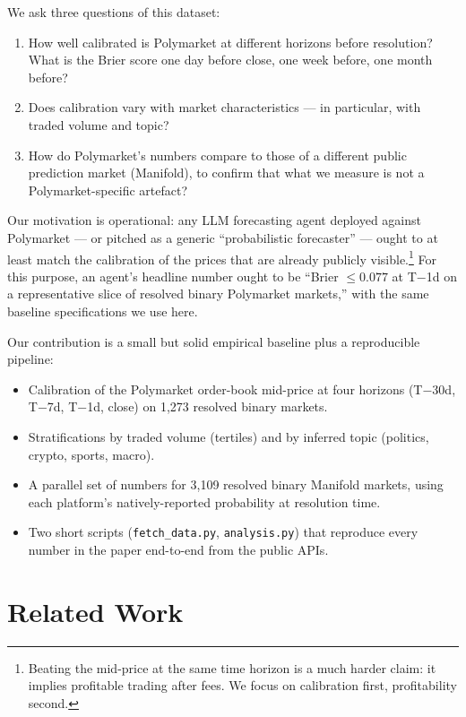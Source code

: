 \documentclass{article}
\begin{document}
We ask three questions of this dataset:

\begin{enumerate}
\item How well calibrated is Polymarket at different horizons before
      resolution? What is the Brier score one day before close, one
      week before, one month before?
\item Does calibration vary with market characteristics --- in
      particular, with traded volume and topic?
\item How do Polymarket's numbers compare to those of a different
      public prediction market (Manifold), to confirm that what we
      measure is not a Polymarket-specific artefact?
\end{enumerate}

Our motivation is operational: any LLM forecasting agent deployed
against Polymarket --- or pitched as a generic ``probabilistic
forecaster'' --- ought to at least match the calibration of the
prices that are already publicly visible.\footnote{Beating the
mid-price at the same time horizon is a much harder claim: it implies
profitable trading after fees. We focus on calibration first,
profitability second.} For this purpose, an agent's headline number
ought to be ``Brier $\le 0.077$ at T$-$1d on a representative slice of
resolved binary Polymarket markets,'' with the same baseline
specifications we use here.

Our contribution is a small but solid empirical baseline plus a
reproducible pipeline:

\begin{itemize}
\item Calibration of the Polymarket order-book mid-price at four
      horizons (T$-$30d, T$-$7d, T$-$1d, close) on 1{,}273 resolved
      binary markets.
\item Stratifications by traded volume (tertiles) and by inferred
      topic (politics, crypto, sports, macro).
\item A parallel set of numbers for 3{,}109 resolved binary Manifold
      markets, using each platform's natively-reported probability at
      resolution time.
\item Two short scripts (\texttt{fetch\_data.py},
      \texttt{analysis.py}) that reproduce every number in the paper
      end-to-end from the public APIs.
\end{itemize}

\section{Related Work}
\end{document}
